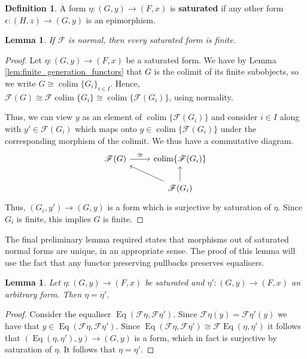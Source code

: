\documentclass[12pt]{article}
\theoremstyle{plain}
\newtheorem{lemma}[thm]{Lemma}
\theoremstyle{definition}
\newtheorem{defn}[thm]{Definition} %
\newcommand{\scr}[1]{\mathscr{#1}}
\newcommand{\lto}{\longrightarrow}
\DeclareMathOperator*{\colim}{colim}
\begin{document}
 \begin{defn}\label{def:saturated}
		A form $\eta: (G, y) \lto (F,x)$ is \textbf{saturated} if any other form $\epsilon: (H, z) \lto (G,y)$ is an epimorphism.
		\end{defn}
	
	\begin{lemma}
		If $\scr{F}$ is normal, then every saturated form is finite.
		\end{lemma}
	\begin{proof}
		Let $\eta: (G, y) \lto (F,x)$ be a saturated form. We have by Lemma \ref{lem:finite_generation_functors} that $G$ is the colimit of its finite subobjects, so we write $G \cong \colim\{ G_i \}_{i \in I}$. Hence, $\scr{F}(G) \cong \scr{F} \colim\{ G_i \} \cong \colim\{ \scr{F}(G_i) \}$, using normality.
  
		Thus, we can view $y$ as an element of $\colim\{ \scr{F}(G_i) \}$ and consider $i \in I$ along with $y' \in \scr{F}(G_i)$ which maps onto $y \in \colim\{ \scr{F}(G_i) \}$ under the corresponding morphism of the colimit. We thus have a commutative diagram.
		\begin{equation}
			\begin{tikzcd}
				\scr{F}(G)\arrow[r,"{\cong}"] & \colim\{ \scr{F}(G_i) \}\\
				& \scr{F} (G_i)\arrow[u]\arrow[ul]
				\end{tikzcd}
			\end{equation}
		Thus, $(G_i, y') \lto (G,y)$ is a form which is surjective by saturation of $\eta$. Since $G_i$ is finite, this implies $G$ is finite.
		\end{proof}
	The final preliminary lemma required states that morphisms out of saturated normal forms are unique, in an appropriate sense. The proof of this lemma will use the fact that any functor preserving pullbacks preserves equalisers.
	\begin{lemma}\label{lem:saturated_unique}
		Let $\eta: (G,y) \lto (F,x)$ be saturated and $\eta': (G,y) \lto (F,x)$ an arbitrary form. Then $\eta = \eta'$.
		\end{lemma}
	\begin{proof}
		Consider the equaliser $\operatorname{Eq}(\scr{F}\eta, \scr{F}\eta')$. Since $\scr{F}\eta(y) = \scr{F}\eta'(y)$ we have that $y \in \operatorname{Eq}(\scr{F}\eta, \scr{F}\eta')$. Since $\operatorname{Eq}(\scr{F}\eta, \scr{F}\eta') \cong \scr{F}\operatorname{Eq}(\eta,\eta')$ it follows that $(\operatorname{Eq}(\eta,\eta'), y) \lto (G,y)$ is a form, which in fact is surjective by saturation of $\eta$. It follows that $\eta = \eta'$.
		\end{proof}
	
\end{document}
